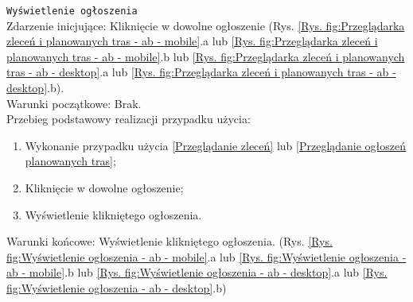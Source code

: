 \texttt{Wyświetlenie ogłoszenia} \\
Zdarzenie inicjujące: Kliknięcie w dowolne ogłoszenie (Rys. \ref{Rys. fig:Przeglądarka zleceń i planowanych tras - ab - mobile}.a lub \ref{Rys. fig:Przeglądarka zleceń i planowanych tras - ab - mobile}.b lub \ref{Rys. fig:Przeglądarka zleceń i planowanych tras - ab - desktop}.a lub \ref{Rys. fig:Przeglądarka zleceń i planowanych tras - ab - desktop}.b). \\
Warunki początkowe: Brak. \\
Przebieg podstawowy realizacji przypadku użycia:
\begin{enumerate}
    \item Wykonanie przypadku użycia \ref{Przeglądanie zleceń} lub \ref{Przeglądanie ogłoszeń planowanych tras};
    \item Kliknięcie w dowolne ogłoszenie;
    \item Wyświetlenie klikniętego ogłoszenia.
\end{enumerate}
Warunki końcowe: Wyświetlenie klikniętego ogłoszenia. (Rys. \ref{Rys. fig:Wyświetlenie ogłoszenia - ab - mobile}.a lub \ref{Rys. fig:Wyświetlenie ogłoszenia - ab - mobile}.b lub \ref{Rys. fig:Wyświetlenie ogłoszenia - ab - desktop}.a lub \ref{Rys. fig:Wyświetlenie ogłoszenia - ab - desktop}.b)
